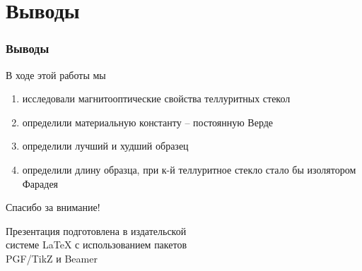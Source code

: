 \documentclass[10pt,pdf,hyperref={unicode}, dvipsnames, handout]{beamer}
\begin{document}
\section{Выводы}
\begin{frame}
	\frametitle{Выводы}
	В ходе этой работы мы 
	\begin{enumerate}
		\item исследовали магнитооптические свойства теллуритных стекол
		\item определили материальную константу -- постоянную Верде
		\item определили лучший и худший образец
		\item определили длину образца, при к-й теллуритное стекло стало бы изолятором Фарадея
	\end{enumerate}
\end{frame}

\begin{frame}[plain]
	\vspace{4cm}
	\begin{center}
		\Huge
		Спасибо за внимание!
	\end{center}
	\vspace{2.5cm}
	\begin{center}
		\color{black!30!white}
		Презентация подготовлена в издательской \\
		системе LaTeX с использованием пакетов \\
		PGF/TikZ и Beamer
	\end{center}
\end{frame}
\end{document}
